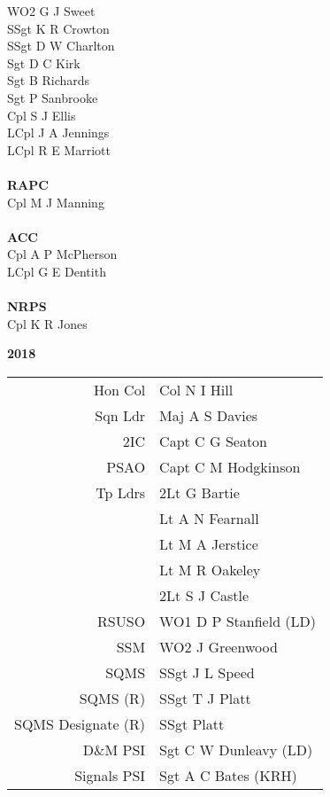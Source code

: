 \documentclass[a4paper,7pt]{book}
\begin{document}
\begin{multicols}{4}
  WO2 G J Sweet \\
  SSgt K R Crowton \\
  SSgt D W Charlton \\
  Sgt D C Kirk \\
  Sgt B Richards \\
  Sgt P Sanbrooke \\
  Cpl S J Ellis \\
  LCpl J A Jennings \\
  LCpl R E Marriott \\ \\
  \textbf{RAPC} \\
  Cpl M J Manning \\ \\
  \textbf{ACC} \\
  Cpl A P McPherson \\
  LCpl G E Dentith \\ \\
  \textbf{NRPS} \\
  Cpl K R Jones
\end{multicols}

\pagebreak

\begin{center}
  {
    \Huge
    \textbf{2018}
  }
\end{center}

\begin{center}
  \small
  \begin{tabular}{rl}
    Hon Col & Col N I Hill \\
    Sqn Ldr & Maj A S Davies \\
    2IC & Capt C G Seaton \\
    PSAO & Capt C M Hodgkinson \\
    Tp Ldrs & 2Lt G Bartie \\
     & Lt A N Fearnall \\
     & Lt M A Jerstice \\
     & Lt M R Oakeley \\
     & 2Lt S J Castle \\
    RSUSO & WO1 D P Stanfield (LD) \\
    SSM & WO2 J Greenwood \\
    SQMS & SSgt J L Speed \\
    SQMS (R) & SSgt T J Platt \\
    SQMS Designate (R) & SSgt Platt \\
    D\&M PSI & Sgt C W Dunleavy (LD) \\
    Signals PSI & Sgt A C Bates (KRH) \\
  \end{tabular}
\end{center}
\end{document}
